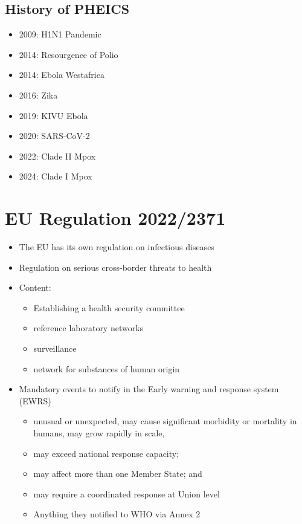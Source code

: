 \documentclass[
  letterpaper,
  DIV=11,
  numbers=noendperiod]{scrreprt}
\providecommand{\tightlist}{%
  \setlength{\itemsep}{0pt}\setlength{\parskip}{0pt}}\usepackage{longtable,booktabs,array}
\begin{document}
\subsection{History of PHEICS}\label{history-of-pheics}

\begin{itemize}
\tightlist
\item
  2009: H1N1 Pandemic
\item
  2014: Resourgence of Polio
\item
  2014: Ebola Westafrica
\item
  2016: Zika
\item
  2019: KIVU Ebola
\item
  2020: SARS-CoV-2
\item
  2022: Clade II Mpox
\item
  2024: Clade I Mpox
\end{itemize}

\section{EU Regulation 2022/2371}\label{eu-regulation-20222371}

\begin{itemize}
\tightlist
\item
  The EU has its own regulation on infectious diseases
\item
  Regulation on serious cross-border threats to health
\item
  Content:

  \begin{itemize}
  \tightlist
  \item
    Establishing a health security committee
  \item
    reference laboratory networks
  \item
    surveillance
  \item
    network for substances of human origin
  \end{itemize}
\item
  Mandatory events to notify in the Early warning and response system
  (EWRS)

  \begin{itemize}
  \tightlist
  \item
    unusual or unexpected, may cause significant morbidity or mortality
    in humans, may grow rapidly in scale,
  \item
    may exceed national response capacity;
  \item
    may affect more than one Member State; and
  \item
    may require a coordinated response at Union level
  \item
    Anything they notified to WHO via Annex 2
  \end{itemize}
\end{itemize}
\end{document}
